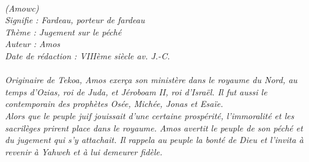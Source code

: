 \BFont
\noindent\hrulefill
\textit{
\bigskip
{\centering{}
\\(Amowc)
\\Signifie : Fardeau, porteur de fardeau
\\Thème : Jugement sur le péché
\\Auteur : Amos
\\Date de rédaction : VIIIème siècle av. J.-C.\\}
}
\textit{
\\Originaire de Tekoa, Amos exerça son ministère dans le royaume du Nord, au temps d’Ozias, roi de Juda, et Jéroboam II, roi d’Israël. Il fut aussi le contemporain des prophètes Osée, Michée, Jonas et Esaïe.
\bigskip
\\Alors que le peuple juif jouissait d’une certaine prospérité, l’immoralité et les sacrilèges prirent place dans le royaume. Amos avertit le peuple de son péché et du jugement qui s’y attachait. Il rappela au peuple la bonté de Dieu et l’invita à revenir à Yahweh et à lui demeurer fidèle.\bigskip
}
\par\nobreak\noindent\hrulefill
